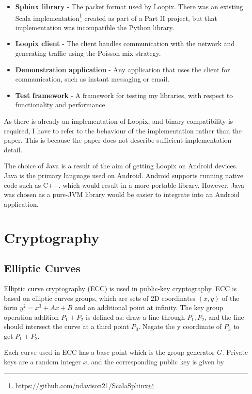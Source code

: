 \documentclass[final,dissertation.tex]{subfiles}
\begin{document}
\begin{itemize}
	\item \textbf{Sphinx library} - The packet format used by Loopix. There was an existing Scala implementation\footnote{https://github.com/ndavison21/ScalaSphinx} created as part of a Part II project, but that implementation was incompatible the Python library.
	\item \textbf{Loopix client} - The client handles communication with the network and generating traffic using the Poisson mix strategy. 
	\item \textbf{Demonstration application} - Any application that uses the client for communication, such as instant messaging or email.
	\item \textbf{Test framework} - A framework for testing my libraries, with respect to functionality and performance.
\end{itemize}

As there is already an implementation of Loopix, and binary compatibility is required, I have to refer to the behaviour of the implementation rather than the paper. This is because the paper does not describe sufficient implementation detail.

The choice of Java is a result of the aim of getting Loopix on Android devices. Java is the primary language used on Android. Android supports running native code such as C++, which would result in a more portable library. However, Java was chosen as a pure-JVM library would be easier to integrate into an Android application.

\section{Cryptography}

\subsection{Elliptic Curves}

Elliptic curve cryptography (ECC) is used in public-key cryptography. ECC is based on elliptic curves groups, which are sets of 2D coordinates $(x, y)$ of the form $y^2 = x^3 + Ax + B$ and an additional point at infinity. The key group operation addition $P_1 + P_2$ is defined as: draw a line through $P_1, P_2$, and the line should intersect the curve at a third point $P_3$. Negate the y coordinate of $P_3$ to get $P_1 + P_2$.

Each curve used in ECC has a base point which is the group generator $G$. Private keys are a random integer $x$, and the corresponding public key is given by 
\end{document}
